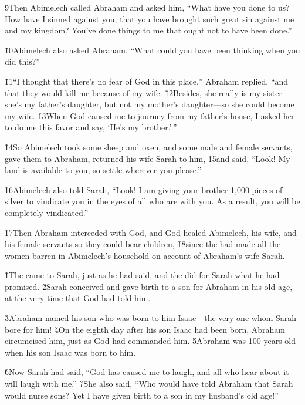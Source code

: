 \v{9}Then Abimelech called Abraham and asked him, ``What have you done to us? How have I sinned against you, that you have brought such great sin against me and my kingdom? You've done things to me that ought not to have been done.''

\v{10}Abimelech also asked Abraham, ``What could you have been thinking when you did this?''

\v{11}``I thought that there's no fear of God in this place,'' Abraham replied, ``and that they would kill me because of my wife. \v{12}Besides, she really is my sister---she's my father's daughter, but not my mother's daughter---so she could become my wife. \v{13}When God caused me to journey from my father's house, I asked her to do me this favor and say, `He's my brother.'\,''

\v{14}So Abimelech took some sheep and oxen, and some male and female servants, gave them to Abraham, returned his wife Sarah to him, \v{15}and said, ``Look! My land is available to you, so settle wherever you please.''

\v{16}Abimelech also told Sarah, ``Look! I am giving your brother 1,000 pieces of silver to vindicate you in the eyes of all who are with you. As a result, you will be completely vindicated.''

\v{17}Then Abraham interceded with God, and God healed Abimelech, his wife, and his female servants so they could bear children, \v{18}since the  had made all the women barren in Abimelech's household on account of Abraham's wife Sarah.

\v{1}The  came to Sarah, just as he had said, and the  did for Sarah what he had promised. \v{2}Sarah conceived and gave birth to a son for Abraham in his old age, at the very time that God had told him.

\v{3}Abraham named his son who was born to him Isaac---the very one whom Sarah bore for him! \v{4}On the eighth day after his son Isaac had been born, Abraham circumcised him, just as God had commanded him. \v{5}Abraham was 100 years old when his son Isaac was born to him.

\v{6}Now Sarah had said, ``God has caused me to laugh, and all who hear about it will laugh with me.'' \v{7}She also said, ``Who would have told Abraham that Sarah would nurse sons? Yet I have given birth to a son in my husband's old age!''

